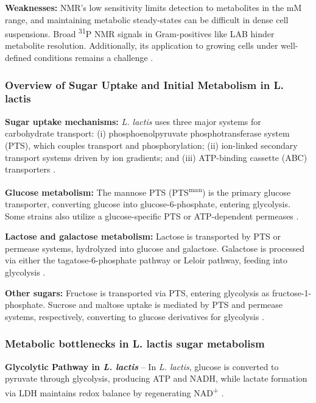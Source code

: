 \textbf{Weaknesses:} NMR's low sensitivity limits detection to metabolites in the mM range, and maintaining metabolic steady-states can be difficult in dense cell suspensions. Broad \textsuperscript{31}P NMR signals in Gram-positives like LAB hinder metabolite resolution. Additionally, its application to growing cells under well-defined conditions remains a challenge \cite*{L3-SugarMet}.

\subsubsection{Overview of Sugar Uptake and Initial Metabolism in L. lactis}
\textbf{Sugar uptake mechanisms:} \textit{L. lactis} uses three major systems for carbohydrate transport: (i) phosphoenolpyruvate phosphotransferase system (PTS), which couples transport and phosphorylation; (ii) ion-linked secondary transport systems driven by ion gradients; and (iii) ATP-binding cassette (ABC) transporters \cite*{L3-SugarMet}.

\textbf{Glucose metabolism:} The mannose PTS (PTS\textsuperscript{man}) is the primary glucose transporter, converting glucose into glucose-6-phosphate, entering glycolysis. Some strains also utilize a glucose-specific PTS or ATP-dependent permeases \cite*{L3-SugarMet}.

\textbf{Lactose and galactose metabolism:} Lactose is transported by PTS or permease systems, hydrolyzed into glucose and galactose. Galactose is processed via either the tagatose-6-phosphate pathway or Leloir pathway, feeding into glycolysis \cite*{L3-SugarMet}.

\textbf{Other sugars:} Fructose is transported via PTS, entering glycolysis as fructose-1-phosphate. Sucrose and maltose uptake is mediated by PTS and permease systems, respectively, converting to glucose derivatives for glycolysis \cite*{L3-SugarMet}.

\subsubsection{Metabolic bottlenecks in L. lactis sugar metabolism}

\textbf{Glycolytic Pathway in \textit{L. lactis}} – In \textit{L. lactis}, glucose is converted to pyruvate through glycolysis, producing ATP and NADH, while lactate formation via LDH maintains redox balance by regenerating NAD\textsuperscript{+} \cite*{L3-SugarMet}.

